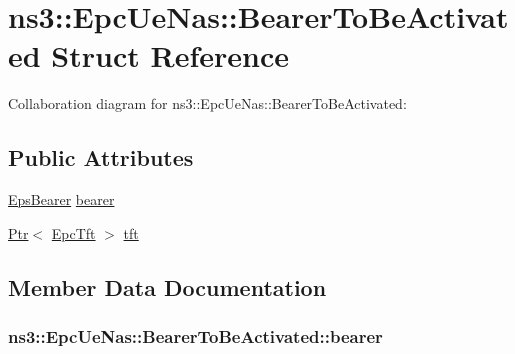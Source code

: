 \hypertarget{structns3_1_1EpcUeNas_1_1BearerToBeActivated}{}\section{ns3\+:\+:Epc\+Ue\+Nas\+:\+:Bearer\+To\+Be\+Activated Struct Reference}
\label{structns3_1_1EpcUeNas_1_1BearerToBeActivated}


Collaboration diagram for ns3\+:\+:Epc\+Ue\+Nas\+:\+:Bearer\+To\+Be\+Activated\+:
\subsection*{Public Attributes}
\begin{DoxyCompactItemize}
\item 
\hyperlink{structns3_1_1EpsBearer}{Eps\+Bearer} \hyperlink{structns3_1_1EpcUeNas_1_1BearerToBeActivated_a3dfeae782406a36ae4fdde32130f80e6}{bearer}
\item 
\hyperlink{classns3_1_1Ptr}{Ptr}$<$ \hyperlink{classns3_1_1EpcTft}{Epc\+Tft} $>$ \hyperlink{structns3_1_1EpcUeNas_1_1BearerToBeActivated_a29bd7669f5a3036c798596ab44bf9c81}{tft}
\end{DoxyCompactItemize}


\subsection{Member Data Documentation}
\subsubsection[{\texorpdfstring{bearer}{bearer}}]{ ns3\+::\+Epc\+Ue\+Nas\+::\+Bearer\+To\+Be\+Activated\+::bearer}\hypertarget{structns3_1_1EpcUeNas_1_1BearerToBeActivated_a3dfeae782406a36ae4fdde32130f80e6}{}\label{structns3_1_1EpcUeNas_1_1BearerToBeActivated_a3dfeae782406a36ae4fdde32130f80e6}

